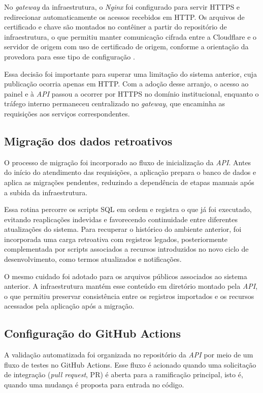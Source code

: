 No \emph{gateway} da infraestrutura, o \emph{Nginx} foi configurado para servir HTTPS e redirecionar automaticamente os acessos recebidos em HTTP. Os arquivos de certificado e chave são montados no contêiner a partir do repositório de infraestrutura, o que permitiu manter comunicação cifrada entre a Cloudflare e o servidor de origem com uso de certificado de origem, conforme a orientação da provedora para esse tipo de configuração \cite{cloudflareoriginca}.

Essa decisão foi importante para superar uma limitação do sistema anterior, cuja publicação ocorria apenas em HTTP. Com a adoção desse arranjo, o acesso ao painel e à \emph{API} passou a ocorrer por HTTPS no domínio institucional, enquanto o tráfego interno permaneceu centralizado no \emph{gateway}, que encaminha as requisições aos serviços correspondentes.

\subsection{Migração dos dados retroativos}

O processo de migração foi incorporado ao fluxo de inicialização da \emph{API}. Antes do início do atendimento das requisições, a aplicação prepara o banco de dados e aplica as migrações pendentes, reduzindo a dependência de etapas manuais após a subida da infraestrutura.

Essa rotina percorre os scripts SQL em ordem e registra o que já foi executado, evitando reaplicações indevidas e favorecendo continuidade entre diferentes atualizações do sistema. Para recuperar o histórico do ambiente anterior, foi incorporada uma carga retroativa com registros legados, posteriormente complementada por scripts associados a recursos introduzidos no novo ciclo de desenvolvimento, como termos atualizados e notificações.

O mesmo cuidado foi adotado para os arquivos públicos associados ao sistema anterior. A infraestrutura mantém esse conteúdo em diretório montado pela \emph{API}, o que permitiu preservar consistência entre os registros importados e os recursos acessados pela aplicação após a migração.

\subsection{Configuração do GitHub Actions}

A validação automatizada foi organizada no repositório da \emph{API} por
meio de um fluxo de testes no GitHub Actions. Esse fluxo é acionado
quando uma solicitação de integração (\emph{pull request}, PR) é aberta
para a ramificação principal, isto é, quando uma mudança é proposta para
entrada no código.

